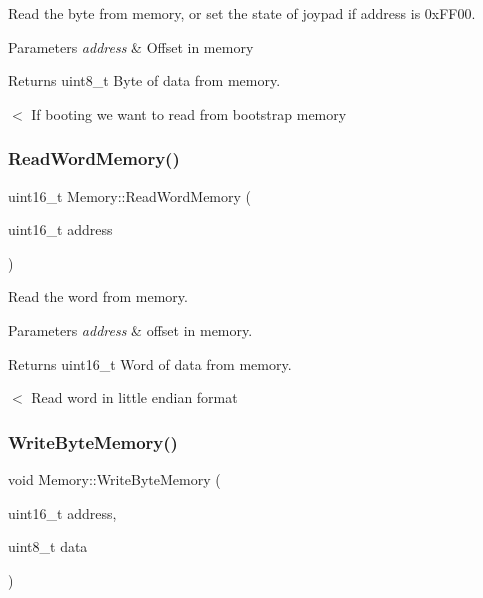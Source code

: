 Read the byte from memory, or set the state of joypad if address is 0x\+F\+F00. 


\begin{DoxyParams}{Parameters}
{\em address} & Offset in memory \\
\hline
\end{DoxyParams}
\begin{DoxyReturn}{Returns}
uint8\+\_\+t Byte of data from memory. 
\end{DoxyReturn}
$<$ If booting we want to read from bootstrap memory \mbox{\label{classMemory_ad314fa06068d46d02aabd53277c24b48}} 
\subsubsection{\texorpdfstring{Read\+Word\+Memory()}{ReadWordMemory()}}
{\footnotesize\ttfamily uint16\+\_\+t Memory\+::\+Read\+Word\+Memory (\begin{DoxyParamCaption}\item[{uint16\+\_\+t}]{address }\end{DoxyParamCaption})}



Read the word from memory. 


\begin{DoxyParams}{Parameters}
{\em address} & offset in memory. \\
\hline
\end{DoxyParams}
\begin{DoxyReturn}{Returns}
uint16\+\_\+t Word of data from memory. 
\end{DoxyReturn}
$<$ Read word in little endian format \mbox{\label{classMemory_a82280ff8234c97746eb14dfcb60f102a}} 
\subsubsection{\texorpdfstring{Write\+Byte\+Memory()}{WriteByteMemory()}}
{\footnotesize\ttfamily void Memory\+::\+Write\+Byte\+Memory (\begin{DoxyParamCaption}\item[{uint16\+\_\+t}]{address,  }\item[{uint8\+\_\+t}]{data }\end{DoxyParamCaption})}



